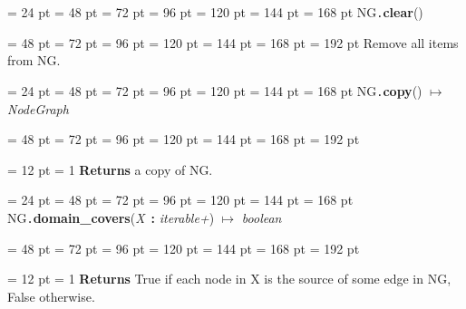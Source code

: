{{\par}
{\par \noindent  \leftskip = 24 pt  \leftmargini = 48 pt  \leftmarginii = 72 pt  \leftmarginiii = 96 pt  \leftmarginiv = 120 pt  \leftmarginv = 144 pt  \leftmarginvi = 168 pt NG{\tt .\/}{\bf {\large {\bf clear\/}}\/}(){\par \noindent
{\par \noindent  \leftskip = 48 pt  \leftmargini = 72 pt  \leftmarginii = 96 pt  \leftmarginiii = 120 pt  \leftmarginiv = 144 pt  \leftmarginv = 168 pt  \leftmarginvi = 192 pt  Remove all items from NG.
\par}
\par}
\par}
{\par \noindent  \leftskip = 24 pt  \leftmargini = 48 pt  \leftmarginii = 72 pt  \leftmarginiii = 96 pt  \leftmarginiv = 120 pt  \leftmarginv = 144 pt  \leftmarginvi = 168 pt NG{\tt .\/}{\bf {\large {\bf copy\/}}\/}() \(\mapsto \)  {\em NodeGraph\/}{\par \noindent
{\par \noindent  \leftskip = 48 pt  \leftmargini = 72 pt  \leftmarginii = 96 pt  \leftmarginiii = 120 pt  \leftmarginiv = 144 pt  \leftmarginv = 168 pt  \leftmarginvi = 192 pt {\par \noindent
{\par \pagebreak[3.100000] \noindent \hangindent = 12 pt \hangafter = 1 
{\bf Returns \/} a copy of NG.
\par}
\par}
\par}
\par}
\par}
{\par \noindent  \leftskip = 24 pt  \leftmargini = 48 pt  \leftmarginii = 72 pt  \leftmarginiii = 96 pt  \leftmarginiv = 120 pt  \leftmarginv = 144 pt  \leftmarginvi = 168 pt NG{\tt .\/}{\bf {\large {\bf domain{\_}covers\/}}\/}({\em X\/}~{\bf :}  {\em iterable+\/}) \(\mapsto \)  {\em boolean\/}{\par \noindent
{\par \noindent  \leftskip = 48 pt  \leftmargini = 72 pt  \leftmarginii = 96 pt  \leftmarginiii = 120 pt  \leftmarginiv = 144 pt  \leftmarginv = 168 pt  \leftmarginvi = 192 pt {\par \noindent
{\par \pagebreak[3.100000] \noindent \hangindent = 12 pt \hangafter = 1 
{\bf Returns \/} True if each node in X is the source of some edge in NG, False otherwise.\par}
}}}}}
